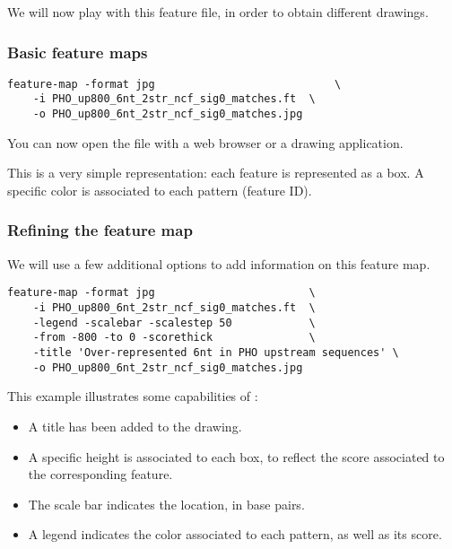 We will now play with this feature file, in order to obtain different
drawings.

\subsubsection{Basic feature maps}

\begin{verbatim}
feature-map -format jpg                            \
    -i PHO_up800_6nt_2str_ncf_sig0_matches.ft  \
    -o PHO_up800_6nt_2str_ncf_sig0_matches.jpg
\end{verbatim}

You can now open the file
 with a web
browser or a drawing application.

This is a very simple representation: each feature is represented as a
box. A specific color is associated to each pattern (feature ID). 

\subsubsection{Refining the feature map}

We will use a few additional options to add information on this
feature map. 

\begin{verbatim}
feature-map -format jpg                        \
    -i PHO_up800_6nt_2str_ncf_sig0_matches.ft  \
    -legend -scalebar -scalestep 50            \
    -from -800 -to 0 -scorethick               \
    -title 'Over-represented 6nt in PHO upstream sequences' \
    -o PHO_up800_6nt_2str_ncf_sig0_matches.jpg
\end{verbatim}

This example illustrates some capabilities of :

\begin{itemize}
\item A title has been added to the drawing. 

\item A specific height is associated to each box, to reflect
the score associated to the corresponding feature.

\item The scale bar indicates the location, in base pairs. 

\item A legend indicates the color associated to each pattern, as well 
as its score. 

\end{itemize}

